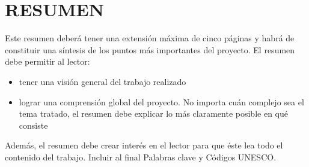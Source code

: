 \documentclass[a4paper, 11pt, spanish, twoside]{article}
\begin{document}
\section*{RESUMEN} %

Este resumen deberá tener una extensión máxima de cinco páginas y habrá de constituir una síntesis de los puntos más importantes del proyecto. El resumen debe permitir al lector: 
\begin{itemize}
    \item tener una visión general del trabajo realizado
    \item lograr una comprensión global del proyecto. No importa cuán complejo sea el tema tratado, el resumen debe explicar lo más claramente posible en qué consiste
\end{itemize}

Además, el resumen debe crear interés en el lector para que éste lea todo el contenido del trabajo. Incluir al final Palabras clave y Códigos UNESCO.

\afterpage{\blankpage} %


\newpage
\renewcommand*\contentsname{ÍNDICE} %
\tableofcontents %
\afterpage{\blankpage} %
\end{document}
